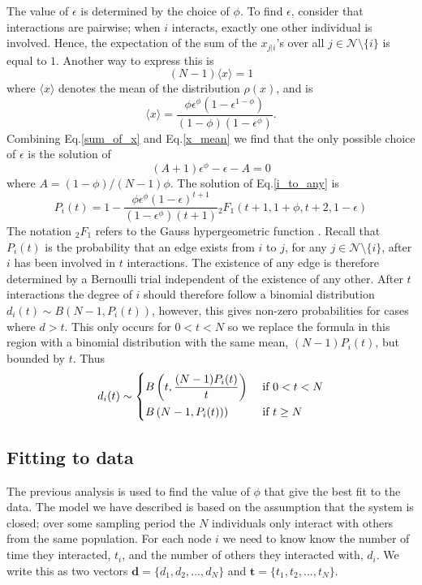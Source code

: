\documentclass[10pt]{article}
\begin{document}
\begin{multicols}{2}
The value of $\epsilon$ is determined by the choice of $\phi$. To find $\epsilon$, consider that interactions are pairwise; when $i$ interacts, exactly one other individual is involved. Hence, the expectation of the sum of the $x_{j|i}$'s over all $j\in \mathcal{N}\setminus\{i\}$ is equal to $1$. Another way to express this is
\begin{equation}
\label{sum_of_x}
(N-1) \langle x \rangle = 1
\end{equation}
where $\langle x \rangle$ denotes the mean of the distribution $\rho(x)$, and is
\begin{equation}
\label{x_mean}
\langle x \rangle=\frac{\phi\epsilon^{\phi}(1-\epsilon^{1-\phi})}{(1-\phi)(1-\epsilon^{\phi})}.
\end{equation}
Combining Eq.\eqref{sum_of_x} and Eq.\eqref{x_mean} we find that the only possible choice of $\epsilon$ is the solution of
\begin{equation}
\label{epsilon}
(A+1)\epsilon^{\phi}-\epsilon-A=0
\end{equation}
where $A=(1-\phi)/(N-1)\phi$. The solution of Eq.\eqref{i_to_any} is
\begin{equation}
\label{hyper_solution}
P_{i}(t)=1-\frac{\phi\epsilon^{\phi}(1-\epsilon)^{t+1}}{(1-\epsilon^{\phi})(t+1)}{}_{2}F_{1}(t+1, 1+\phi, t+2, 1-\epsilon)
\end{equation}
The notation ${}_{2}F_{1}$ refers to the Gauss hypergeometric function \cite{absteg}. Recall that $P_{i}(t)$ is the probability that an edge exists from $i$ to $j$, for any $j\in \mathcal{N}\setminus\{i\}$, after $i$ has been involved in $t$ interactions. The existence of any edge is therefore determined by a Bernoulli trial independent of the existence of any other. After $t$ interactions the degree of $i$ should therefore follow a binomial distribution $d_{i}(t)\sim B(N-1,P_{i}(t))$, however, this gives non-zero probabilities for cases where $d>t$. This only occurs for $0<t<N$ so we replace the formula in this region with a binomial distribution with the same mean, $(N-1)P_{i}(t)$, but bounded by $t$. Thus 
\begin{equation}
\label{binoms} 
d_{i}(t) \sim 
   \begin{dcases}
    B\left(t,\frac{(N-1)P_{i}(t)}{t}\right) & \text{ if }0<t<N\\
    B\left(N-1,P_{i}(t))\right) & \text{ if } t \geq N
  \end{dcases}
\end{equation}
\subsection{Fitting to data}
\label{fitting}
The previous analysis is used to find the value of $\phi$ that give the best fit to the data. The model we have described is based on the assumption that the system is closed; over some sampling period the $N$ individuals only interact with others from the same population. For each node $i$ we need to know know the number of time they interacted, $t_{i}$, and the number of others they interacted with, $d_{i}$. We write this as two vectors $\textbf{d}=\{d_{1},d_{2},...,d_{N}\}$ and $\textbf{t}=\{t_{1},t_{2},...,t_{N}\}$.


\end{multicols}
\end{document}
